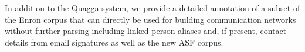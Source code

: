 \documentclass{llncs}
\newcommand{\dummyfig}[3]{
	\centering
	\fbox{
		\begin{minipage}[c][#1\textheight][c]{#2\textwidth}
			\centering{#3}
		\end{minipage}
	}
}
\begin{document}
In addition to the Quagga system, we provide a detailed annotation of a subset of the Enron corpus that can directly be used for building communication networks without further parsing including linked person aliases and, if present, contact details from email signatures as well as the new ASF corpus.






 
\end{document}

